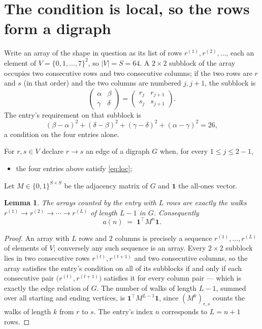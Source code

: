 \documentclass[11pt,a4paper]{article}
\theoremstyle{plain}
\newtheorem{lemma}[theorem]{Lemma}
\theoremstyle{definition}
\begin{document}
\section{The condition is local, so the rows form a digraph}

Write an array of the shape in question as its list of rows
$r^{(1)},r^{(2)},\dots$, each an element of
$V=\{0,1,\dots,7\}^{2}$, so $|V|=S=64$. A $2\times2$ subblock of the array
occupies two consecutive rows and two consecutive columns; if the two rows are $r$
and $s$ (in that order) and the two columns are numbered $j,j+1$,
the subblock is
\[
\begin{pmatrix}\alpha&\beta\\\gamma&\delta\end{pmatrix}=\begin{pmatrix}r_j&r_{j+1}\\s_j&s_{j+1}\end{pmatrix}.
\]
The entry's requirement on that subblock is
\begin{equation}\label{eq:loc}
(\beta-\alpha)^2+(\delta-\beta)^2+(\gamma-\delta)^2+(\alpha-\gamma)^2=26,
\end{equation}
a condition on the four entries alone.

For $r,s\in V$ declare $r\to s$ an edge of a digraph $G$ when, for every
$1\le j\le 2-1$,
\begin{itemize}
\item the four entries above satisfy \eqref{eq:loc};

\end{itemize}
Let $M\in\{0,1\}^{S\times S}$ be the adjacency matrix of $G$ and $\mathbf{1}$ the
all-ones vector.

\begin{lemma}\label{lem:walk}
The arrays counted by the entry with $L$ rows are exactly the walks
$r^{(1)}\to r^{(2)}\to\cdots\to r^{(L)}$ of length $L-1$ in $G$. Consequently
\[
a(n)\;=\;\mathbf{1}^{\!\top}M^{n}\mathbf{1} .
\]
\end{lemma}

\begin{proof}
An array with $L$ rows and $2$ columns is precisely a sequence
$r^{(1)},\dots,r^{(L)}$ of elements of $V$; conversely any such sequence is an array.
Every $2\times2$ subblock lies in two consecutive rows $r^{(t)},r^{(t+1)}$ and two
consecutive columns, so the array satisfies the entry's condition on all of its subblocks
if and only if each consecutive pair $\bigl(r^{(t)},r^{(t+1)}\bigr)$ satisfies it for
every column pair --- which is exactly the edge relation of $G$. The number of walks of
length $L-1$, summed over all starting and ending vertices, is
$\mathbf{1}^{\!\top}M^{L-1}\mathbf{1}$, since $(M^{k})_{r,s}$ counts the walks of
length $k$ from $r$ to $s$. The entry's index $n$ corresponds to $L=n+1$ rows.
\end{proof}
\end{document}
